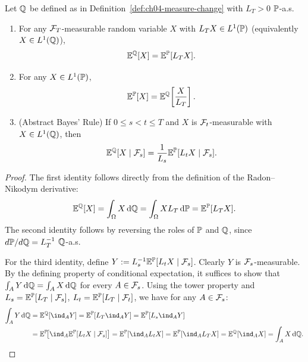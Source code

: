 \begin{proposition}
    \label{prop:ch04-measure-change}
    Let $\mathbb{Q}$ be defined as in Definition~\ref{def:ch04-measure-change} with $L_T > 0$ $\mathbb{P}$-a.s.
    \begin{enumerate}
        \item For any $\mathcal{F}_T$-measurable random variable $X$ with $L_T X \in L^1(\mathbb{P})$ (equivalently $X \in L^1(\mathbb{Q})$),
        \[
            \mathbb{E}^{\mathbb{Q}}[X] = \mathbb{E}^{\mathbb{P}}[L_T X].
        \]
        \item For any $X \in L^1(\mathbb{P})$,
        \[
            \mathbb{E}^{\mathbb{P}}[X] = \mathbb{E}^{\mathbb{Q}}\!\left[\frac{X}{L_T}\right].
        \]
        \item (Abstract Bayes' Rule) If $0 \le s < t \le T$ and $X$ is $\mathcal{F}_t$-measurable with $X \in L^1(\mathbb{Q})$, then
        \[
            \mathbb{E}^{\mathbb{Q}}[X \mid \mathcal{F}_s] = \frac{1}{L_s}\mathbb{E}^{\mathbb{P}}[L_t X \mid \mathcal{F}_s].
        \]
    \end{enumerate}
\end{proposition}
\begin{proof}
    The first identity follows directly from the definition of the Radon--Nikodym derivative:
    \[
        \mathbb{E}^{\mathbb{Q}}[X] = \int_{\Omega} X \,\mathrm{d}\mathbb{Q} = \int_{\Omega} X L_T \,\mathrm{d}\mathbb{P} = \mathbb{E}^{\mathbb{P}}[L_T X].
    \]
    The second identity follows by reversing the roles of $\mathbb{P}$ and $\mathbb{Q}$, since $d\mathbb{P}/d\mathbb{Q} = L_T^{-1}$ $\mathbb{Q}$-a.s.

    For the third identity, define $Y := L_s^{-1}\mathbb{E}^{\mathbb{P}}[L_t X \mid \mathcal{F}_s]$. Clearly $Y$ is $\mathcal{F}_s$-measurable. By the defining property of conditional expectation, it suffices to show that $\int_A Y \,\mathrm{d}\mathbb{Q} = \int_A X \,\mathrm{d}\mathbb{Q}$ for every $A \in \mathcal{F}_s$. Using the tower property and $L_s = \mathbb{E}^{\mathbb{P}}[L_T \mid \mathcal{F}_s]$, $L_t = \mathbb{E}^{\mathbb{P}}[L_T \mid \mathcal{F}_t]$, we have for any $A \in \mathcal{F}_s$:
    \begin{align*}
        \int_A Y \dd\Q
        &= \E^{\Q}[\ind_A Y]
        = \E^{\Prob}[L_T \ind_A Y]
        = \E^{\Prob}[L_s \ind_A Y] \\
        &= \E^{\Prob}\!\bigl[\ind_A \E^{\Prob}[L_t X \mid \F_s]\bigr]
        = \E^{\Prob}[\ind_A L_t X]
        = \E^{\Prob}[\ind_A L_T X]
        = \E^{\Q}[\ind_A X]
        = \int_A X \dd\Q. \qedhere
    \end{align*}
\end{proof}

